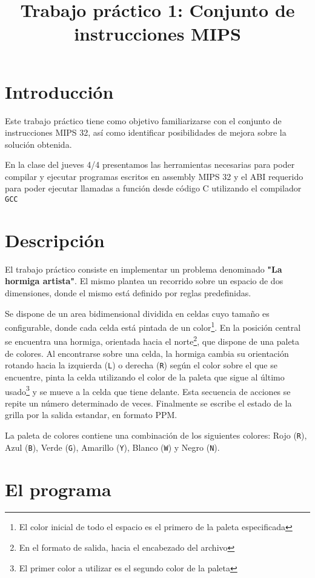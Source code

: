 \documentclass{article}
\author{}
\title{Trabajo práctico 1: Conjunto de instrucciones MIPS}
\begin{document}
\date{}
\maketitle

\section{Introducción}
Este trabajo práctico tiene como objetivo familiarizarse con el conjunto de instrucciones
MIPS 32, así como identificar posibilidades de mejora sobre la solución obtenida.

En la clase del jueves 4/4 presentamos las herramientas necesarias para poder compilar y ejecutar
programas escritos en assembly MIPS 32 y el ABI requerido para poder ejecutar llamadas a 
función desde código C utilizando el compilador \texttt{GCC}

\section{Descripción}
El trabajo práctico consiste en implementar un problema denominado \textbf{"La hormiga artista"}. El mismo plantea un recorrido
sobre un espacio de dos dimensiones, donde el mismo está definido por reglas predefinidas.

Se dispone de un area bidimensional dividida en celdas cuyo tamaño es configurable, donde cada celda está pintada de un color\footnote{El color inicial de todo el espacio es el primero de la paleta especificada}. En la posición central se encuentra una
hormiga, orientada hacia el norte\footnote{En el formato de salida, hacia el encabezado del archivo}, que dispone de una paleta de colores. 
Al encontrarse sobre una celda, la hormiga cambia su orientación rotando hacia la izquierda (\texttt{L}) o derecha (\texttt{R}) según el 
color sobre el que se encuentre, pinta la celda utilizando el color de la paleta que sigue al último usado\footnote{El primer color a utilizar es el segundo 
color de la paleta} y se mueve a la celda que tiene delante. Esta secuencia de acciones se repite un número determinado de veces.
Finalmente se escribe el estado de la grilla por la salida estandar, en formato PPM.

La paleta de colores contiene una combinación de los siguientes colores: 
Rojo (\texttt{R}), Azul (\texttt{B}), Verde (\texttt{G}), Amarillo (\texttt{Y}), Blanco (\texttt{W}) y Negro (\texttt{N}).

\pagebreak
\section{El programa}
\end{document}
